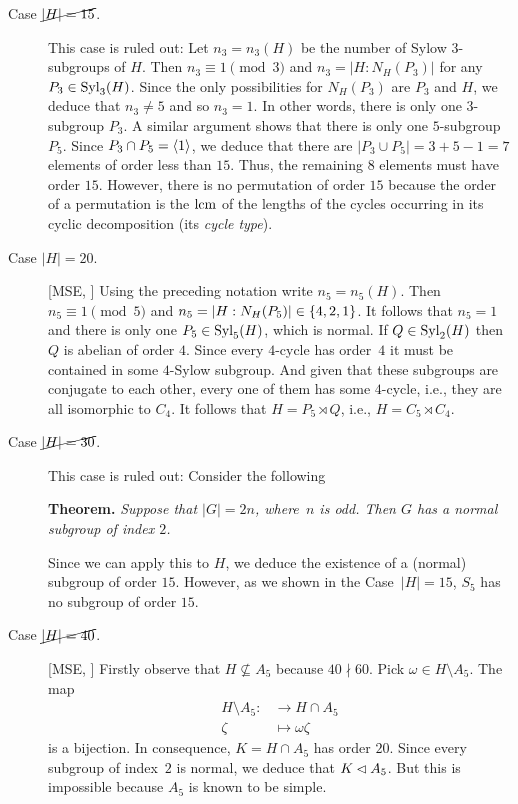 \begin{solution}
\begin{description}
        \item[Case $\cancel{|H|=15}$.] This case is ruled out: Let $n_3=n_3(H)$ be the number of Sylow $3$-subgroups of $H$. Then $n_3\equiv1\pmod3$ and $n_3=|H:N_H(P_3)|$ for any $P_3\in{\rm Syl}_3(H)$. Since the only possibilities for $N_H(P_3)$ are $P_3$ and $H$, we deduce that $n_3\ne5$ and so $n_3=1$. In other words, there is only one $3$-subgroup $P_3$. A similar argument shows that there is only one $5$-subgroup $P_5$. Since $P_3\cap P_5=\langle1\rangle$, we deduce that there are $|P_3\cup P_5|=3+5-1=7$ elements of order less than $15$. Thus, the remaining $8$ elements must have order $15$. However, there is no permutation of order $15$ because the order of a permutation is the $\operatorname{lcm}$ of the lengths of the cycles occurring in its cyclic decomposition (its \textsl{cycle type}).

        \item[Case $|H|=20$.] [MSE, \citeyear{2065244}] Using the preceding notation write $n_5=n_5(H)$. Then $n_5\equiv1\pmod5$ and $n_5=|H:N_H(P_5)|\in\{4,2,1\}$. It follows that $n_5=1$ and there is only one $P_5\in{\rm Syl}_5(H)$, which is normal. If $Q\in{\rm Syl}_2(H)$ then $Q$ is abelian of order $4$. Since every $4$-cycle has order~$4$ it must be contained in some $4$-Sylow subgroup. And given that these subgroups are conjugate to each other, every one of them has some $4$-cycle, i.e., they are all isomorphic to $C_4$. It follows that $H=P_5\rtimes Q$, i.e., $H=C_5\rtimes C_4$.

        \item[Case $\cancel{|H|=30}$.] This case is ruled out: Consider the following

        \textbf{Theorem.} \textit{Suppose that\/ $|G|=2n$, where\ $n$ is odd. Then\/ $G$ has a normal subgroup of index $2$.}

        Since we can apply this to $H$, we deduce the existence of a (normal) subgroup of order $15$. However, as we shown in the Case~$|H|=15$, $S_5$ has no subgroup of order $15$.

        \item[Case $\cancel{|H|=40}$.] [MSE, \citeauthor{89048}] Firstly observe that $H\nsubseteq A_5$ because $40\nmid60$. Pick $\omega\in H\setminus A_5$. The map
        \begin{align*}
            H\setminus A_5\colon&\to H\cap A_5\\
            \zeta&\mapsto\omega\zeta
        \end{align*}
        is a bijection. In consequence, $K=H\cap A_5$ has order $20$. Since every subgroup of index~$2$ is normal, we deduce that $K\lhd A_5$. But this is impossible because $A_5$ is known to be simple.


\end{description}
\end{solution}
